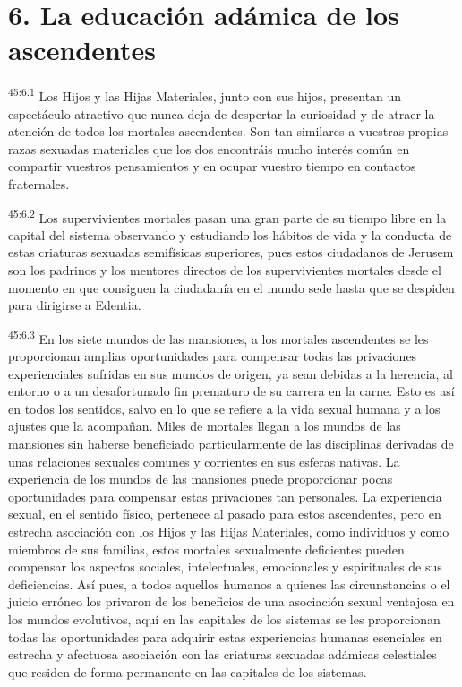 \section*{6. La educación adámica de los ascendentes}
\par
\textsuperscript{45:6.1} Los Hijos y las Hijas Materiales, junto con sus hijos, presentan un espectáculo atractivo que nunca deja de despertar la curiosidad y de atraer la atención de todos los mortales ascendentes. Son tan similares a vuestras propias razas sexuadas materiales que los dos encontráis mucho interés común en compartir vuestros pensamientos y en ocupar vuestro tiempo en contactos fraternales.

\par
\textsuperscript{45:6.2} Los supervivientes mortales pasan una gran parte de su tiempo libre en la capital del sistema observando y estudiando los hábitos de vida y la conducta de estas criaturas sexuadas semifísicas superiores, pues estos ciudadanos de Jerusem son los padrinos y los mentores directos de los supervivientes mortales desde el momento en que consiguen la ciudadanía en el mundo sede hasta que se despiden para dirigirse a Edentia.

\par
\textsuperscript{45:6.3} En los siete mundos de las mansiones, a los mortales ascendentes se les proporcionan amplias oportunidades para compensar todas las privaciones experienciales sufridas en sus mundos de origen, ya sean debidas a la herencia, al entorno o a un desafortunado fin prematuro de su carrera en la carne. Esto es así en todos los sentidos, salvo en lo que se refiere a la vida sexual humana y a los ajustes que la acompañan. Miles de mortales llegan a los mundos de las mansiones sin haberse beneficiado particularmente de las disciplinas derivadas de unas relaciones sexuales comunes y corrientes en sus esferas nativas. La experiencia de los mundos de las mansiones puede proporcionar pocas oportunidades para compensar estas privaciones tan personales. La experiencia sexual, en el sentido físico, pertenece al pasado para estos ascendentes, pero en estrecha asociación con los Hijos y las Hijas Materiales, como individuos y como miembros de sus familias, estos mortales sexualmente deficientes pueden compensar los aspectos sociales, intelectuales, emocionales y espirituales de sus deficiencias. Así pues, a todos aquellos humanos a quienes las circunstancias o el juicio erróneo los privaron de los beneficios de una asociación sexual ventajosa en los mundos evolutivos, aquí en las capitales de los sistemas se les proporcionan todas las oportunidades para adquirir estas experiencias humanas esenciales en estrecha y afectuosa asociación con las criaturas sexuadas adámicas celestiales que residen de forma permanente en las capitales de los sistemas.

